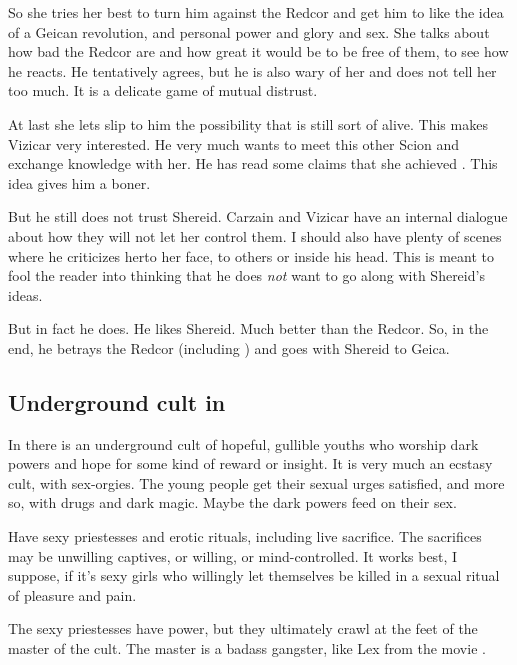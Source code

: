\begin{garbage}
So she tries her best to turn him against the Redcor and get him to like the idea of a Geican revolution, and personal power and glory and sex. 
She talks about how bad the Redcor are and how great it would be to be free of them, to see how he reacts. 
He tentatively agrees, but he is also wary of her and does not tell her too much. 
It is a delicate game of mutual distrust. 

At last she lets slip to him the possibility that \Belzir{} is still sort of alive. 
This makes Vizicar very interested. 
He very much wants to meet this other Scion and exchange knowledge with her. 
He has read some claims that she achieved \apotheosis. 
This idea gives him a boner. 

But he still does not trust Shereid. 
Carzain and Vizicar have an internal dialogue about how they will not let her control them. 
I should also have plenty of scenes where he criticizes her\dash to her face, to others or inside his head. 
This is meant to fool the reader into thinking that he does \emph{not} want to go along with Shereid's ideas. 

But in fact he does. 
He likes Shereid. 
Much better than the Redcor. 
So, in the end, he betrays the Redcor (including \Racel) and goes with Shereid to Geica. 







\subsection{Underground cult in \Redce}
In \Redce{} there is an underground cult of hopeful, gullible youths who worship dark powers and hope for some kind of reward or insight. 
It is very much an ecstasy cult, with sex-orgies. 
The young people get their sexual urges satisfied, and more so, with drugs and dark magic. 
Maybe the dark powers feed on their sex. 

Have sexy priestesses and erotic rituals, including live sacrifice. 
The sacrifices may be unwilling captives, or willing, or mind-controlled. 
It works best, I suppose, if it's sexy girls who willingly let themselves be killed in a sexual ritual of pleasure and pain. 

The sexy priestesses have power, but they ultimately crawl at the feet of the master of the cult. 
The master is a badass gangster, like Lex from the movie \cite{Movie:GargoylesRevenge}. 



\end{garbage}
